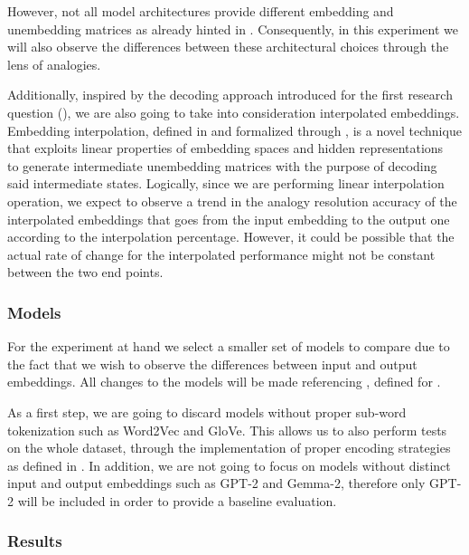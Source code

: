 However, not all model architectures provide different embedding and unembedding matrices as already hinted in .
Consequently, in this experiment we will also observe the differences between these architectural choices through the lens of analogies.

Additionally, inspired by the decoding approach introduced for the first research question (), we are also going to take into consideration interpolated embeddings.
Embedding interpolation, defined in  and formalized through , is a novel technique that exploits linear properties of embedding spaces and hidden representations~\cite{park2023, mikolov2013, drozd2016} to generate intermediate unembedding matrices with the purpose of decoding said intermediate states.
Logically, since we are performing linear interpolation operation, we expect to observe a trend in the analogy resolution accuracy of the interpolated embeddings that goes from the input embedding to the output one according to the interpolation percentage.
However, it could be possible that the actual rate of change for the interpolated performance might not be constant between the two end points. 

\subsubsection{Models}

For the experiment at hand we select a smaller set of models to compare due to the fact that we wish to observe the differences between input and output embeddings.
All changes to the models will be made referencing , defined for .

As a first step, we are going to discard models without proper sub-word tokenization such as Word2Vec and GloVe.
This allows us to also perform tests on the whole dataset, through the implementation of proper encoding strategies as defined in .
In addition, we are not going to focus on models without distinct input and output embeddings such as GPT-2 and Gemma-2, therefore only GPT-2 will be included in order to provide a baseline evaluation.

\subsubsection{Results}

